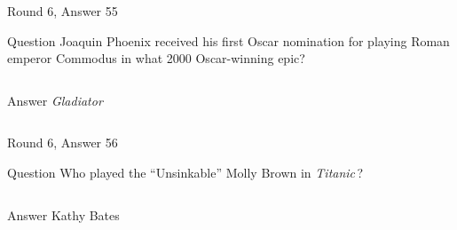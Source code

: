 \documentclass[11pt]{beamer}
\begin{document}
\begin{frame}[t]{Round 6, Answer 55}
\vspace{2em}
\begin{block}{Question}
Joaquin Phoenix received his first Oscar nomination for playing Roman emperor Commodus in what 2000 Oscar-winning epic?
\end{block}
\pause{}
\begin{columns}[T,totalwidth=\linewidth]
\begin{column}{0.35\linewidth}
\begin{block}{Answer}
\emph{Gladiator}
\end{block}
\end{column}
\begin{column}{0.6\linewidth}
\begin{center}
\texttt{[image: \{Images/jp-gladiator]}.jpg}
\end{center}
\end{column}
\end{columns}
\end{frame}
    

\begin{frame}[t]{Round 6, Answer 56}
\vspace{2em}
\begin{block}{Question}
Who played the ``Unsinkable'' Molly Brown in \emph{Titanic}\,?
\end{block}
\pause{}
\begin{columns}[T,totalwidth=\linewidth]
\begin{column}{0.35\linewidth}
\begin{block}{Answer}
Kathy Bates
\end{block}
\end{column}
\begin{column}{0.6\linewidth}
\begin{center}
\texttt{[image: \{Images/mollybrown]}.jpg}
\end{center}
\end{column}
\end{columns}
\end{frame}
    
\end{document}
